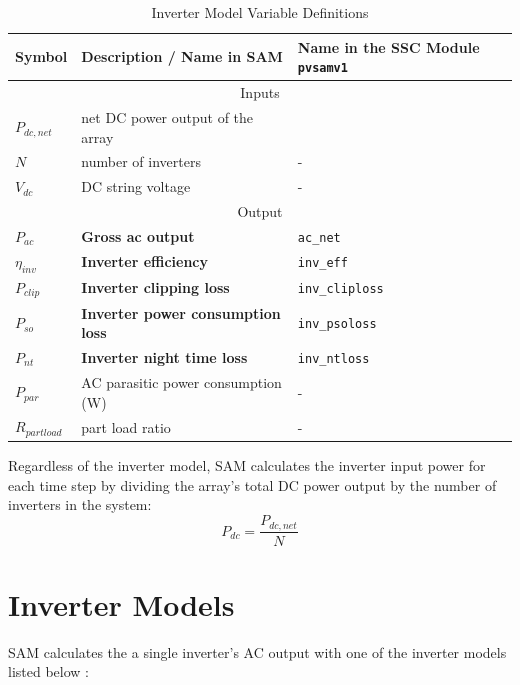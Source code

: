 \documentclass[12pt,letterpaper]{article}
\begin{document}
\begin{table}
\begin{center}
\caption{Inverter Model Variable Definitions}
\begin{tabular}{lll}
\midrule
Symbol & Description / \textbf{Name in SAM} & Name in the SSC Module \texttt{pvsamv1}\\
\midrule
\multicolumn{3}{c}{Inputs}\\
$P_{dc,net}$ & net DC power output of the array & \\
$N$ & number of inverters & - \\
$V_{dc}$ & DC string voltage & - \\
\midrule
\multicolumn{3}{c}{Output}\\
$P_{ac}$ & \textbf{Gross ac output} & \texttt{ac\_net} \\
$\eta_{inv}$ & \textbf{Inverter efficiency} & \texttt{inv\_eff}  \\
$P_{clip}$ & \textbf{Inverter clipping loss} & \texttt{inv\_cliploss}  \\
$P_{so}$ & \textbf{Inverter power consumption loss}& \texttt{inv\_psoloss}  \\
$P_{nt}$ & \textbf{Inverter night time loss}& \texttt{inv\_ntloss}  \\
$P_{par}$ & AC parasitic power consumption (W) & - \\%
$R_{partload}$ & part load ratio & - \\
\midrule
\end{tabular}
\label{tab-invertervars}
\end{center}
\end{table}

Regardless of the inverter model, SAM calculates the inverter input power for each time step by dividing the array's total DC power output by the number of inverters in the system:
\begin{equation}\label{eqn-invinputpower}
P_{dc} = \frac{P_{dc,net}}{N}
\end{equation}

\section{Inverter Models}\label{sec-inverteroptions}

SAM calculates the a single inverter's AC output with one of the inverter models listed below \citep{blair2013}:
\end{document}
